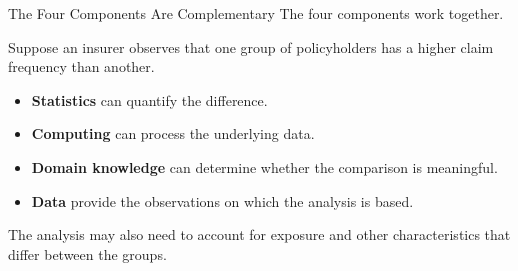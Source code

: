\documentclass[
  ignorenonframetext,
  aspectratio=169,
]{beamer}
\providecommand{\tightlist}{%
  \setlength{\itemsep}{0pt}\setlength{\parskip}{0pt}}
\begin{document}
\begin{frame}{The Four Components Are Complementary}
\protect{}\label{the-four-components-are-complementary}
The four components work together.

Suppose an insurer observes that one group of policyholders has a higher
claim frequency than another.

\begin{itemize}
\tightlist
\item
  \textbf{Statistics} can quantify the difference.
\item
  \textbf{Computing} can process the underlying data.
\item
  \textbf{Domain knowledge} can determine whether the comparison is
  meaningful.
\item
  \textbf{Data} provide the observations on which the analysis is based.
\end{itemize}

The analysis may also need to account for exposure and other
characteristics that differ between the groups.
\end{frame}
\end{document}
